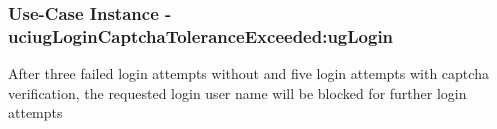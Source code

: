
	\subsubsection{Use-Case Instance - uciugLoginCaptchaToleranceExceeded:ugLogin}
	
	After three failed login attempts without and five login attempts with captcha verification, the requested login user name will be blocked for further login attempts		  
	\begin{operationmodel}
	
	\end{operationmodel} 

	
